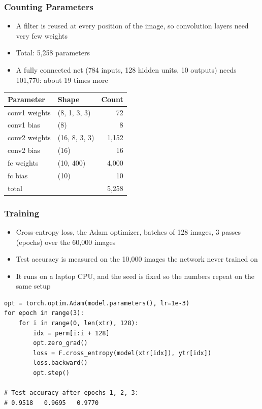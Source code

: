 \begin{frame}[fragile]\frametitle{Counting Parameters}
\begin{itemize}
\item A filter is reused at every position of the image, so convolution layers need very few weights
\item Total: 5,258 parameters
\item A fully connected net (784 inputs, 128 hidden units, 10 outputs) needs 101,770: about 19 times more
\end{itemize}
\begin{center}
\small
\begin{tabular}{llr}
\hline
Parameter & Shape & Count \\
\hline
conv1 weights & (8, 1, 3, 3) & 72 \\
conv1 bias & (8) & 8 \\
conv2 weights & (16, 8, 3, 3) & 1,152 \\
conv2 bias & (16) & 16 \\
fc weights & (10, 400) & 4,000 \\
fc bias & (10) & 10 \\
\hline
total & & 5,258 \\
\hline
\end{tabular}
\end{center}
\end{frame}

\begin{frame}[fragile]\frametitle{Training}
\begin{itemize}
\item Cross-entropy loss, the Adam optimizer, batches of 128 images, 3 passes (epochs) over the 60,000 images
\item Test accuracy is measured on the 10,000 images the network never trained on
\item It runs on a laptop CPU, and the seed is fixed so the numbers repeat on the same setup
\end{itemize}
\begin{lstlisting}
opt = torch.optim.Adam(model.parameters(), lr=1e-3)
for epoch in range(3):
    for i in range(0, len(xtr), 128):
        idx = perm[i:i + 128]
        opt.zero_grad()
        loss = F.cross_entropy(model(xtr[idx]), ytr[idx])
        loss.backward()
        opt.step()

# Test accuracy after epochs 1, 2, 3:
# 0.9518   0.9695   0.9770
\end{lstlisting}
\end{frame}

